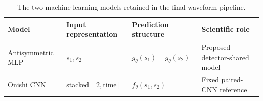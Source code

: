 \begin{table}[H]
    \centering
    \caption{The two machine-learning models retained in the final waveform pipeline.}
    \label{tab:model-summary}
    \small
    \begin{tabular}{llll}
        \toprule
        Model & Input representation & Prediction structure & Scientific role \\
        \midrule
        Antisymmetric MLP & \(s_1,s_2\) & \(g_\theta(s_1)-g_\theta(s_2)\) & Proposed detector-shared model \\
        Onishi CNN & stacked \([2,\mathrm{time}]\) & \(f_\theta(s_1,s_2)\) & Fixed paired-CNN reference \\
        \bottomrule
    \end{tabular}
\end{table}
